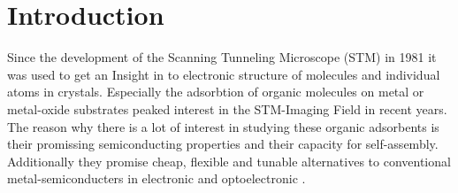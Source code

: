 \chapter{Introduction}
\label{sec:anmerkung}
Since the development of the Scanning Tunneling Microscope (STM) in 1981 it was used to get an Insight in to electronic structure of molecules and individual atoms in crystals.
Especially the adsorbtion of organic molecules on metal or metal-oxide substrates peaked interest in the STM-Imaging Field in recent years.
The reason why there is a lot of interest in studying these organic adsorbents is their promissing semiconducting properties and their capacity for self-assembly.
Additionally they promise cheap, flexible and tunable alternatives to conventional metal-semiconducters in electronic and optoelectronic \cite{OTERO2017105}.
